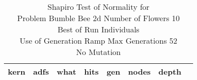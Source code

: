 \begin{table}[H]
\caption{Shapiro Test of Normality for \\ Problem  Bumble Bee 2d  Number of Flowers 10\\Best of Run Individuals \\ Use of Generation Ramp  Max Generations 52\\ No Mutation \\}
\begin{center}
\scalebox{0.8} %
{
\begin{tabular}{lrrrrrrr}
\hline
kern & adfs & what & hits & gen & nodes & depth \\
\hline


\end{tabular}
}
\end{center}
\end{table}

